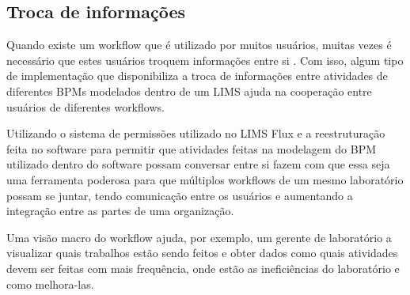 \subsection{Troca de informações}


Quando existe um workflow que é utilizado por muitos usuários, muitas vezes é necessário que estes usuários troquem informações entre si \R. Com isso, algum tipo de implementação que disponibiliza a troca de informações entre atividades de diferentes BPMs modelados dentro de um LIMS ajuda na cooperação entre usuários de diferentes workflows.


Utilizando o sistema de permissões utilizado no LIMS Flux \R e a reestruturação feita no software para permitir que atividades feitas na modelagem do BPM utilizado dentro do software possam conversar entre si fazem com que essa seja uma ferramenta poderosa para que múltiplos workflows de um mesmo laboratório possam se juntar, tendo comunicação entre os usuários e aumentando a integração entre as partes de uma organização.




Uma visão macro do workflow ajuda, por exemplo, um gerente de laboratório a visualizar quais trabalhos estão sendo feitos e obter dados como quais atividades devem ser feitas com mais frequência, onde estão as ineficiências do laboratório e como melhora-las.

